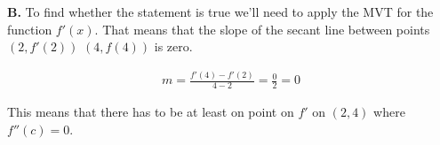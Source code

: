 \documentclass[13pt, a4paper, twoside]{article}
\begin{document}
\begin{enumerate}
\textbf{B.} To find whether the statement is true we'll need to apply the 
MVT for the function $f'(x)$. That means that the slope of the secant line 
between points $(2, f'(2))$ $(4, f(4))$ is zero.

\begin{align*}
	m = \frac{f'(4)-f'(2)}{4-2} = \frac{0}{2} = 0
\end{align*}

This means that there has to be at least on point on $f'$ on $(2, 4)$ where
$f''(c)=0$.




\end{enumerate}
\end{document}
